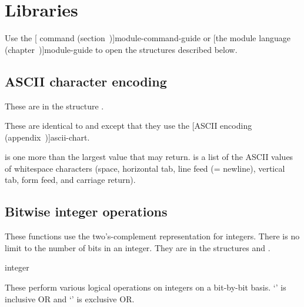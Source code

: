 

\chapter{Libraries}

Use the
[ command (section~\Ref{})]{module-command-guide}
 or
[the module language (chapter~\Ref)]{module-guide}
 to open the structures described below.

\section{ASCII character encoding}
\label{ascii-procedures}

These are in the structure .

\begin{protos}
\end{protos}
\noindent
These are identical to  and  except that
 they use the
[ASCII encoding (appendix~\Ref)]{ascii-chart}.

\begin{protos}
\end{protos}
 is one more than the largest value that 
 may return.
 is a list of the ASCII values of whitespace characters
 (space, horizontal tab, line feed (= newline), vertical tab, form feed, and
 carriage return).

\section{Bitwise integer operations}

These functions use the two's-complement representation for integers.
There is no limit to the number of bits in an integer.
They are in the structures  and .

\begin{protos}
 {integer}
\end{protos}
\noindent
These perform various logical operations on integers on a bit-by-bit
basis. `' is inclusive OR and `' is exclusive OR.


